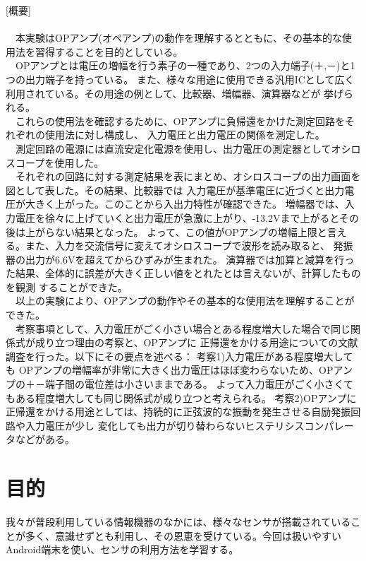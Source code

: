 \documentclass[a4j]{jarticle}
\begin{document}
{\Large [概要]}\\\\
\ \ 本実験はOPアンプ(オペアンプ)の動作を理解するとともに、その基本的な使用法を習得することを目的としている。\\
\ \ OPアンプとは電圧の増幅を行う素子の一種であり、2つの入力端子(＋,－)と1つの出力端子を持っている。
また、様々な用途に使用できる汎用ICとして広く利用されている。その用途の例として、比較器、増幅器、演算器などが
挙げられる。\\
\ \ これらの使用法を確認するために、OPアンプに負帰還をかけた測定回路をそれぞれの使用法に対し構成し、
入力電圧と出力電圧の関係を測定した。\\
\ \ 測定回路の電源には直流安定化電源を使用し、出力電圧の測定器としてオシロスコープを使用した。\\
\ \ それぞれの回路に対する測定結果を表にまとめ、オシロスコープの出力画面を図として表した。その結果、比較器では
入力電圧が基準電圧に近づくと出力電圧が大きく上がった。このことから入出力特性が確認できた。
増幅器では、入力電圧を徐々に上げていくと出力電圧が急激に上がり、-13.2Vまで上がるとその後は上がらない結果となった。
よって、この値がOPアンプの増幅上限と言える。また、入力を交流信号に変えてオシロスコープで波形を読み取ると、
発振器の出力が6.6Vを超えてからひずみが生まれた。
演算器では加算と減算を行った結果、全体的に誤差が大きく正しい値をとれたとは言えないが、計算したものを観測
することができた。\\
\ \ 以上の実験により、OPアンプの動作やその基本的な使用法を理解することができた。\\
\ \ 考察事項として、入力電圧がごく小さい場合とある程度増大した場合で同じ関係式が成り立つ理由の考察と、OPアンプに
正帰還をかける用途についての文献調査を行った。以下にその要点を述べる： 考察1)入力電圧がある程度増大しても
OPアンプの増幅率が非常に大きく出力電圧はほぼ変わらないため、OPアンプの＋－端子間の電位差は小さいままである。
よって入力電圧がごく小さくてもある程度増大しても同じ関係式が成り立つと考えられる。 
考察2)OPアンプに正帰還をかける用途としては、持続的に正弦波的な振動を発生させる自励発振回路や入力電圧が少し
変化しても出力が切り替わらないヒステリシスコンパレータなどがある。
\newpage


\section{目的}

我々が普段利用している情報機器のなかには、様々なセンサが搭載されていることが多く、意識せずとも利用し、その恩恵を受けている。今回は扱いやすいAndroid端末を使い、センサの利用方法を学習する。
\end{document}
